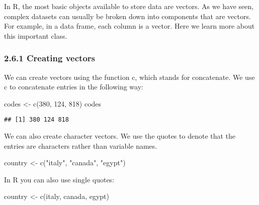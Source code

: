 \documentclass[
]{article}
\newenvironment{Shaded}{\begin{snugshade}}{\end{snugshade}}
\newcommand{\DecValTok}[1]{\textcolor[rgb]{0.00,0.00,0.81}{#1}}
\newcommand{\FunctionTok}[1]{\textcolor[rgb]{0.00,0.00,0.00}{#1}}
\newcommand{\NormalTok}[1]{#1}
\newcommand{\OtherTok}[1]{\textcolor[rgb]{0.56,0.35,0.01}{#1}}
\newcommand{\StringTok}[1]{\textcolor[rgb]{0.31,0.60,0.02}{#1}}
\begin{document}
In R, the most basic objects available to store data are vectors. As we
have seen, complex datasets can usually be broken down into components
that are vectors. For example, in a data frame, each column is a vector.
Here we learn more about this important class.

\hypertarget{creating-vectors}{%
\subsubsection{2.6.1 Creating vectors}\label{creating-vectors}}

We can create vectors using the function c, which stands for
concatenate. We use c to concatenate entries in the following way:

\begin{Shaded}
\begin{Highlighting}[]
\NormalTok{codes }\OtherTok{\textless{}{-}} \FunctionTok{c}\NormalTok{(}\DecValTok{380}\NormalTok{, }\DecValTok{124}\NormalTok{, }\DecValTok{818}\NormalTok{)}
\NormalTok{codes}
\end{Highlighting}
\end{Shaded}

\begin{verbatim}
## [1] 380 124 818
\end{verbatim}

We can also create character vectors. We use the quotes to denote that
the entries are characters rather than variable names.

\begin{Shaded}
\begin{Highlighting}[]
\NormalTok{country }\OtherTok{\textless{}{-}} \FunctionTok{c}\NormalTok{(}\StringTok{"italy"}\NormalTok{, }\StringTok{"canada"}\NormalTok{, }\StringTok{"egypt"}\NormalTok{)}
\end{Highlighting}
\end{Shaded}

In R you can also use single quotes:

\begin{Shaded}
\begin{Highlighting}[]
\NormalTok{country }\OtherTok{\textless{}{-}} \FunctionTok{c}\NormalTok{(}\StringTok{\textquotesingle{}italy\textquotesingle{}}\NormalTok{, }\StringTok{\textquotesingle{}canada\textquotesingle{}}\NormalTok{, }\StringTok{\textquotesingle{}egypt\textquotesingle{}}\NormalTok{)}
\end{Highlighting}
\end{Shaded}
\end{document}
